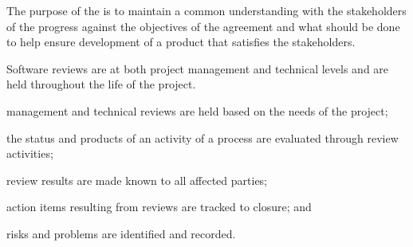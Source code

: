 			\begin{adjustwidth}{2em}{0pt} 

				The purpose of the  is to maintain a common understanding with the stakeholders of the progress against the objectives of the agreement and what should be done to help ensure development of a product that satisfies the stakeholders. 

				Software reviews are at both project management and technical levels and are held throughout the life of the project.

			\end{adjustwidth}

			\begin{adjustwidth}{2em}{0pt} 

				\begin{compactitem}

					\item management and technical reviews are held based on the needs of the project;

					\item the status and products of an activity of a process are evaluated through review activities;

					\item review results are made known to all affected parties;

					\item action items resulting from reviews are tracked to closure; and

					\item risks and problems are identified and recorded.

				\end{compactitem}

			\end{adjustwidth}


